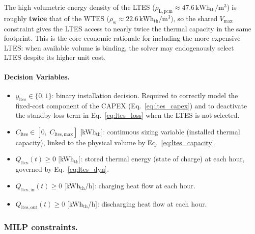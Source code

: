 \documentclass[11pt,a4paper]{report}
\begin{document}
The high volumetric energy density of the LTES ($\rho_\mathrm{L,pcm} \approx
47.6\,\text{kWh}_\mathrm{th}/\text{m}^3$) is roughly \textbf{twice} that of the
WTES ($\rho_\mathrm{w} \approx 22.6\,\text{kWh}_\mathrm{th}/\text{m}^3$), so the
shared $V_\mathrm{max}$ constraint gives the LTES access to nearly twice the
thermal capacity in the same footprint.
This is the core economic rationale for including the more expensive LTES: when
available volume is binding, the solver may endogenously select LTES despite its
higher unit cost.

\paragraph{Decision Variables.}

\begin{itemize}

    \item $y_\mathrm{ltes} \in \{0,1\}$: binary installation decision.
          Required to correctly model the fixed-cost component of the CAPEX
          (Eq.~\eqref{eq:ltes_capex}) and to deactivate the standby-loss term
          in Eq.~\eqref{eq:ltes_loss} when the LTES is not selected.

    \item $C_\mathrm{ltes} \in [0,\; C_\mathrm{ltes,max}]$
          [kWh$_\mathrm{th}$]: continuous sizing variable (installed thermal
          capacity), linked to the physical volume by Eq.~\eqref{eq:ltes_capacity}.

    \item $Q_\mathrm{ltes}(t) \geq 0$ [kWh$_\mathrm{th}$]: stored thermal energy
          (state of charge) at each hour, governed by Eq.~\eqref{eq:ltes_dyn}.

    \item $Q_\mathrm{ltes,in}(t) \geq 0$ [kWh$_\mathrm{th}$/h]: charging heat flow
          at each hour.

    \item $Q_\mathrm{ltes,out}(t) \geq 0$ [kWh$_\mathrm{th}$/h]: discharging heat
          flow at each hour.

\end{itemize}

\subsubsection{MILP constraints.}
\end{document}

